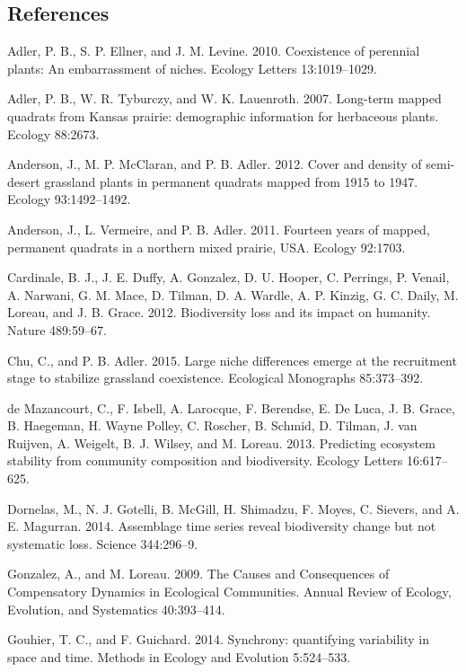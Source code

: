 \documentclass[12pt,]{article}
\begin{document}
\setlength{\parindent}{0ex} \newpage{}

\subsection*{References}\label{references}

Adler, P. B., S. P. Ellner, and J. M. Levine. 2010. Coexistence of
perennial plants: An embarrassment of niches. Ecology Letters
13:1019--1029.

Adler, P. B., W. R. Tyburczy, and W. K. Lauenroth. 2007. Long-term
mapped quadrats from Kansas prairie: demographic information for
herbaceous plants. Ecology 88:2673.

Anderson, J., M. P. McClaran, and P. B. Adler. 2012. Cover and density
of semi-desert grassland plants in permanent quadrats mapped from 1915
to 1947. Ecology 93:1492--1492.

Anderson, J., L. Vermeire, and P. B. Adler. 2011. Fourteen years of
mapped, permanent quadrats in a northern mixed prairie, USA. Ecology
92:1703.

Cardinale, B. J., J. E. Duffy, A. Gonzalez, D. U. Hooper, C. Perrings,
P. Venail, A. Narwani, G. M. Mace, D. Tilman, D. A. Wardle, A. P.
Kinzig, G. C. Daily, M. Loreau, and J. B. Grace. 2012. Biodiversity loss
and its impact on humanity. Nature 489:59--67.

Chu, C., and P. B. Adler. 2015. Large niche differences emerge at the
recruitment stage to stabilize grassland coexistence. Ecological
Monographs 85:373--392.

{{de Mazancourt}}, C., F. Isbell, A. Larocque, F. Berendse, E. {De
Luca}, J. B. Grace, B. Haegeman, H. {Wayne Polley}, C. Roscher, B.
Schmid, D. Tilman, J. van Ruijven, A. Weigelt, B. J. Wilsey, and M.
Loreau. 2013. Predicting ecosystem stability from community composition
and biodiversity. Ecology Letters 16:617--625.

Dornelas, M., N. J. Gotelli, B. McGill, H. Shimadzu, F. Moyes, C.
Sievers, and A. E. Magurran. 2014. Assemblage time series reveal
biodiversity change but not systematic loss. Science 344:296--9.

Gonzalez, A., and M. Loreau. 2009. The Causes and Consequences of
Compensatory Dynamics in Ecological Communities. Annual Review of
Ecology, Evolution, and Systematics 40:393--414.

Gouhier, T. C., and F. Guichard. 2014. Synchrony: quantifying
variability in space and time. Methods in Ecology and Evolution
5:524--533.
\end{document}
